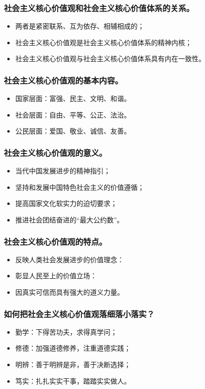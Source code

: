 \documentclass{article}
\begin{document}
\subsubsection{社会主义核心价值观和社会主义核心价值体系的关系。}
\begin{itemize}
    \item 两者是紧密联系、互为依存、相辅相成的；
    \item 社会主义核心价值观是社会主义核心价值体系的精神内核；
    \item 社会主义核心价值观与社会主义核心价值体系具有内在一致性。
\end{itemize}

\subsubsection{社会主义核心价值观的基本内容。}
\begin{itemize}
    \item 国家层面：富强、民主、文明、和谐。
    \item 社会层面：自由、平等、公正、法治。
    \item 公民层面：爱国、敬业、诚信、友善。
\end{itemize}

\subsubsection{社会主义核心价值观的意义。}
\begin{itemize}
    \item 当代中国发展进步的精神指引；
    \item 坚持和发展中国特色社会主义的价值遵循；
    \item 提高国家文化软实力的迫切要求；
    \item 推进社会团结奋进的“最大公约数”。
\end{itemize}

\subsubsection{社会主义核心价值观的特点。}
\begin{itemize}
    \item 反映人类社会发展进步的价值理念：
    \item 彰显人民至上的价值立场：
    \item 因真实可信而具有强大的道义力量。
\end{itemize}

\subsubsection{如何把社会主义核心价值观落细落小落实？}
\begin{itemize}
    \item 勤学：下得苦功夫，求得真学问；
    \item 修德：加强道德修养，注重道德实践；
    \item 明辨：善于明辨是非，善于决断选择；
    \item 笃实：扎扎实实干事，踏踏实实做人。
\end{itemize}
\end{document}
